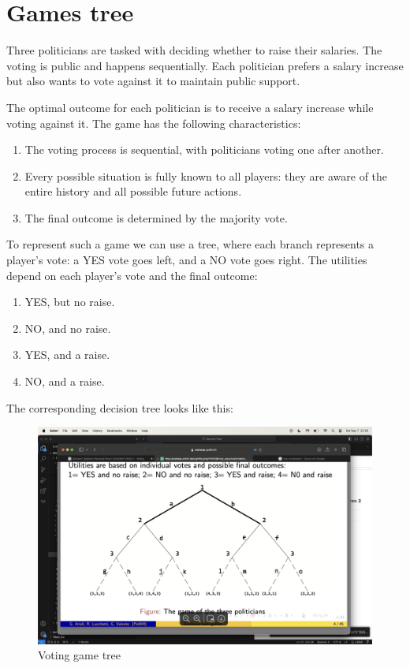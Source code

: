 \section{Games tree}

\begin{example}
    Three politicians are tasked with deciding whether to raise their salaries. 
    The voting is public and happens sequentially. 
    Each politician prefers a salary increase but also wants to vote against it to maintain public support.

    The optimal outcome for each politician is to receive a salary increase while voting against it. 
    The game has the following characteristics:
    \begin{enumerate}
        \item The voting process is sequential, with politicians voting one after another.
        \item Every possible situation is fully known to all players: they are aware of the entire history and all possible future actions.
        \item The final outcome is determined by the majority vote.
    \end{enumerate}
    To represent such a game we can use a tree, where each branch represents a player's vote: a YES vote goes left, and a NO vote goes right. 
    The utilities depend on each player's vote and the final outcome:
    \begin{enumerate} 
        \item YES, but no raise. 
        \item NO, and no raise. 
        \item YES, and a raise. 
        \item NO, and a raise. 
    \end{enumerate}
    The corresponding decision tree looks like this:
    \begin{figure}[H]
        \centering
        \includegraphics[width=0.75\linewidth]{images/tree.png}
        \caption{Voting game tree}
    \end{figure}
\end{example}
